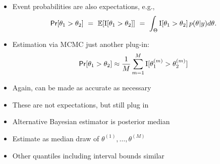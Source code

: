 \documentclass[10pt]{report}
\begin{document}
%
\begin{itemize}
\item Event probabilities are also expectations, e.g.,
\[
\text{\sf Pr}[\theta_1 > \theta_2]
\ = \ \mathbb{E}[\text{I}[\theta_1 > \theta_2]]
\ = \ \int_{\Theta} \text{I}[\theta_1 > \theta_2] \, p(\theta|y) d\theta.
\]
\item Estimation via MCMC just another plug-in:
\[
\text{\sf Pr}[\theta_1 > \theta_2] \approx
\frac{1}{M} \sum_{m=1}^M \text{I}[\theta_1^{(m)} > \theta_2^{(m)}]
\]
\item Again, can be made as accurate as necessary
\end{itemize}


%
\begin{itemize}
\item These are not expectations, but still plug in
\item Alternative Bayesian estimator is posterior median
\item Estimate as median draw of $\theta^{(1)}, \ldots,
  \theta^{(M)}$
\item Other quantiles including interval bounds similar
\end{itemize}


\end{document}
